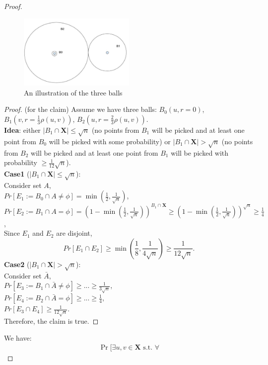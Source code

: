 \begin{proof}
\begin{figure}[h!]
\begin{center}
\caption{An illustration of the three balls}
\includegraphics[width=0.5\textwidth]{chapter_5/files/three_balls.jpg}
\end{center}
\end{figure}
\begin{proof} (for the claim)
Assume we have three balls: $B_0(u,r=0)$, $B_1(v,r=\frac{1}{3}\rho
(u,v))$, $B_2(u,r=\frac{2}{3}\rho (u,v))$.\\ 
\textbf{Idea}: either $|B_1\cap \mathbf{X}|\leq \sqrt{n}$ (no points
from $B_1$ will be picked and at least one point from $B_0$ will be
picked with some probability) or $|B_1 \cap \mathbf{X}|>\sqrt{n}$ (no
points from $B_2$ will be picked and at least one point from $B_1$
will be picked with probability $\geq \frac{1}{12}\sqrt{n}$).\\ 
\textbf{Case1} ($|B_1\cap \mathbf{X}| \leq \sqrt{n}$):\\
Consider set $A$,\\
$Pr[E_1:=B_0 \cap A \neq \phi]=\min (\frac{1}{2}, \frac{1}{\sqrt{n}})$,\\
$Pr[E_2:=B_1\cap A=\phi]=(1-\min(\frac{1}{2},
\frac{1}{\sqrt{n}}))^{B_1\cap \mathbf{X}}\geq (1-\min(\frac{1}{2},
\frac{1}{\sqrt{n}}))^{\sqrt{n}} \geq \frac{1}{4}$,\\ 
Since $E_1$ and $E_2$ are disjoint,
\[
Pr[E_1 \cap E_2] \geq \min (\frac{1}{8},\frac{1}{4\sqrt{n}})\geq
\frac{1}{12\sqrt{n}}. 
\]
\textbf{Case2} ($|B_1\cap \mathbf{X}| > \sqrt{n}$):\\
Consider set $\bar{A}$,\\
$Pr[E_3:=B_1\cap \bar{A}\neq \phi] \geq ... \geq \frac{1}{3\sqrt{n}}$,\\
$Pr[E_4:=B_2\cap \bar{A}= \phi] \geq ... \geq \frac{1}{4}$,\\
$Pr[E_3\cap E_4]\geq \frac{1}{12\sqrt{n}}$.\\
Therefore, the claim is true.
\end{proof}
We have:
\begin{align*}
\Pr\bigg[\exists u,v \in \mathbf{X} \textrm{ s.t. } \forall

\end{align*}
\end{proof}
